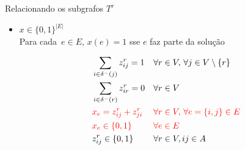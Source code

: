 \documentclass[dvipsnames]{beamer}
\newcommand{\espacoXBinary}{\{0,1\}^{|E|}}
\newcommand{\espacoZBinary}{\{0,1\}^{|E| \times |E|}}
\newcommand{\espacoBinary}{\{0,1\}}
\begin{document}
\begin{frame}{Relacionando os subgrafos $T^{r}$}
  \begin{itemize}
  \item $x \in \espacoXBinary$ \\
    Para cada~$e \in E$, \hbox{$x(e) = 1$} sse $e$ faz parte da solução

    \begin{align}
      &\sum_{i \in \delta^{-}(j)}z^{r}_{ij} = 1 && \forall r \in V,\,\forall j \in V \setminus \{r\} \nonumber\\
      &\sum_{i \in \delta^{-}(r)}z^{r}_{ir} = 0 && \forall r \in V\nonumber\\
      &\textcolor{red}{x_{e} = z^{r}_{ij} + z^{r}_{ji}} && \textcolor{red}{\forall r \in V,\, \forall e = \{i,j\} \in E}\\
      &\textcolor{red}{x_e \in \espacoBinary} && \textcolor{red}{\forall e \in E}\\
      &z^{r}_{ij} \in \espacoBinary && \forall r \in V, ij \in A\nonumber
    \end{align}
    
  \end{itemize}
\end{frame}


\end{document}
